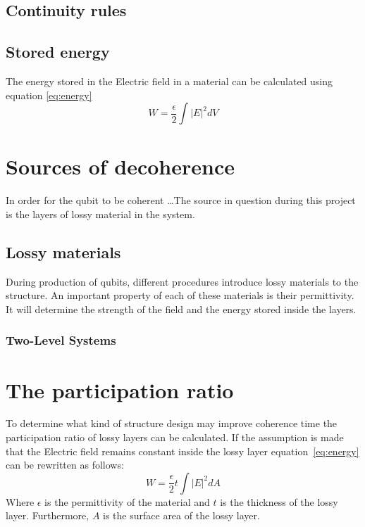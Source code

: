 \subsection{Continuity rules}
\subsection{Stored energy}
The energy stored in the Electric field in a material can be calculated using equation \eqref{eq:energy}
\begin{equation} \label{eq:energy}
	W = \frac{\epsilon}{2}\int{|E|}^{2}dV
\end{equation}

\section{Sources of decoherence}
In order for the qubit to be coherent \ldots The source in question during this project is the layers of lossy material in the system.
\subsection{Lossy materials}
During production of qubits, different procedures introduce lossy materials to the structure. An important property of each of these materials is their permittivity. It will determine the strength of the field and the energy stored inside the layers.
\subsubsection{Two-Level Systems}

\section{The participation ratio}
To determine what kind of structure design may improve coherence time the participation ratio of lossy layers can be calculated. If the assumption is made that the Electric field remains constant inside the lossy layer equation~\eqref{eq:energy} can be rewritten as follows:
\begin{equation}\label{eq:energy_layer}
W = \frac{\epsilon}{2}t\int{|E|}^{2}dA
\end{equation}
Where \(\epsilon\) is the permittivity of the material and \(t\) is the thickness of the lossy layer. Furthermore, \(A\) is the surface area of the lossy layer.


